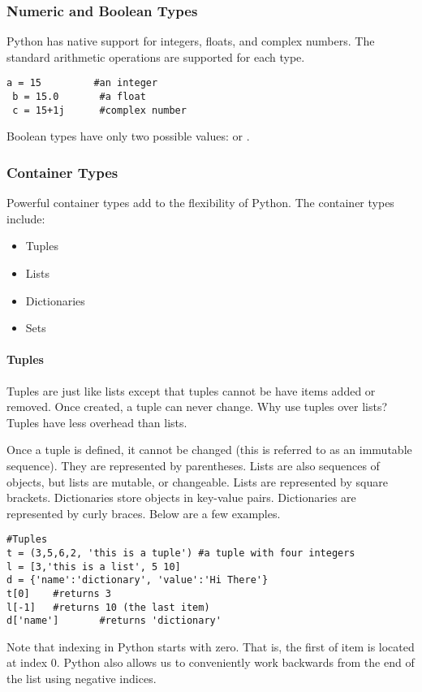 \subsubsection*{Numeric and Boolean Types}
Python has native support for integers, floats, and complex numbers.  The standard arithmetic operations are supported for each type.
\begin{lstlisting}[style=python]
 a = 15         #an integer
 b = 15.0       #a float
 c = 15+1j      #complex number
\end{lstlisting}

Boolean types have only two possible values:  or .

\subsubsection*{Container Types}
Powerful container types add to the flexibility of Python.  The container types include:
\begin{itemize}
 \item Tuples
 \item Lists
 \item Dictionaries
 \item Sets
\end{itemize}

\paragraph{Tuples}
Tuples are just like lists except that tuples cannot be have items added or removed.  Once created, a tuple can never change.  Why use tuples over lists?  Tuples have less overhead than lists.  


Once a tuple is defined, it cannot be changed (this is referred to as an immutable sequence).  They are represented by parentheses.  Lists are also sequences of objects, but lists are mutable, or changeable.  Lists are represented by square brackets.  Dictionaries store objects in key-value pairs.  Dictionaries are represented by curly braces.  Below are a few examples.
\begin{lstlisting}[style=python]
#Tuples
t = (3,5,6,2, 'this is a tuple') #a tuple with four integers
l = [3,'this is a list', 5 10]
d = {'name':'dictionary', 'value':'Hi There'}
t[0]    #returns 3
l[-1]   #returns 10 (the last item)
d['name']       #returns 'dictionary'
\end{lstlisting}
Note that indexing in Python starts with zero.  That is, the first of item is located at index 0.  Python also allows us to conveniently work backwards from the end of the list using negative indices.


